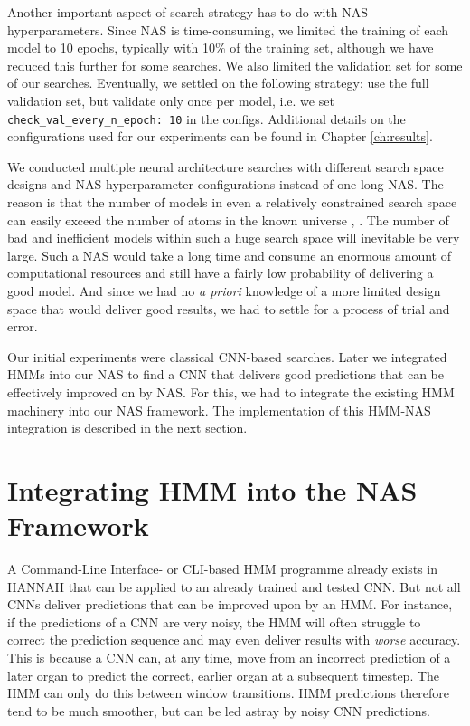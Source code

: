 \documentclass[11pt,a4paper, open=any]{scrbook}
\begin{document}
Another important aspect of search strategy has to do with NAS hyperparameters. Since NAS is time-consuming, we limited the training of each model to 10 epochs, typically with 10\% of the training set, although we have reduced this further for some searches. We also limited the validation set for some of our searches. Eventually, we settled on the following strategy: use the full validation set, but validate only once per model, i.e. we set \texttt{check\_val\_every\_n\_epoch: 10} in the configs. Additional details on the configurations used for our experiments can be found in Chapter \ref{ch:results}.

We conducted multiple neural architecture searches with different search space designs and NAS hyperparameter configurations instead of one long NAS. The reason is that the number of models in even a relatively constrained search space can easily exceed the number of atoms in the known universe \cite{atoms}, \cite{reiber26}. The number of bad and inefficient models within such a huge search space will inevitable be very large. Such a NAS would take a long time and consume an enormous amount of computational resources and still have a fairly low probability of delivering a good model. And since we had no \textit{a priori} knowledge of a more limited design space that would deliver good results, we had to settle for a process of trial and error.

Our initial experiments were classical CNN-based searches. Later we integrated HMMs into our NAS to find a CNN that delivers good predictions that can be effectively improved on by NAS. For this, we had to integrate the existing HMM machinery into our NAS framework. The implementation of this HMM-NAS integration is described in the next section.


\section{Integrating HMM into the NAS Framework}
A Command-Line Interface- or CLI-based HMM programme already exists in HANNAH that can be applied to an already trained and tested CNN. But not all CNNs deliver predictions that can be improved upon by an HMM. For instance, if the predictions of a CNN are very noisy, the HMM will often struggle to correct the prediction sequence and may even deliver results with \textit{worse} accuracy. This is because a CNN can, at any time, move from an incorrect prediction of a later organ to predict the correct, earlier organ at a subsequent timestep. The HMM can only do this between window transitions. HMM predictions therefore tend to be much smoother, but can  be led astray by noisy CNN predictions.
\end{document}
